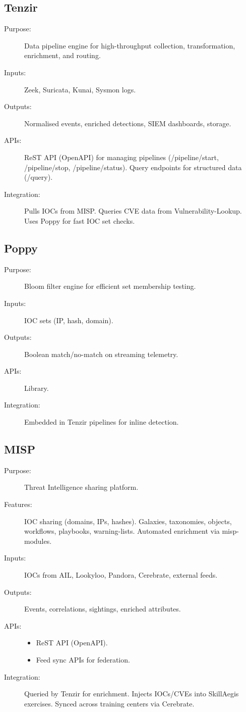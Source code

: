 \documentclass[10pt,a4paper]{report}
\begin{document}
\subsection{Tenzir}
\begin{description}
  \item[Purpose:] Data pipeline engine for high-throughput collection,
  transformation, enrichment, and routing.
  \item[Inputs:] Zeek, Suricata, Kunai, Sysmon logs.
  \item[Outputs:] Normalised events, enriched detections, SIEM dashboards,
  storage.
  \item[APIs:] ReST API (OpenAPI) for managing pipelines
  (/pipeline/start, /pipeline/stop, /pipeline/status). Query endpoints for
  structured data (/query).
  \item[Integration:] Pulls IOCs from MISP. Queries CVE data from
  Vulnerability-Lookup. Uses Poppy for fast IOC set checks.
\end{description}

\subsection{Poppy}
\begin{description}
  \item[Purpose:] Bloom filter engine for efficient set membership testing.
  \item[Inputs:] IOC sets (IP, hash, domain).
  \item[Outputs:] Boolean match/no-match on streaming telemetry.
  \item[APIs:] Library\cite{poppy}.
  \item[Integration:] Embedded in Tenzir pipelines for inline detection.
\end{description}

\subsection{MISP}
\begin{description}
  \item[Purpose:] Threat Intelligence sharing platform.
  \item[Features:] IOC sharing (domains, IPs, hashes). Galaxies, taxonomies,
  objects, workflows, playbooks, warning-lists. Automated enrichment via
  misp-modules.
  \item[Inputs:] IOCs from AIL, Lookyloo, Pandora, Cerebrate, external feeds.
  \item[Outputs:] Events, correlations, sightings, enriched attributes.
  \item[APIs:]
    \begin{itemize}
        \item ReST API (OpenAPI)\cite{mopenapi}.
        \item Feed sync APIs for federation.
    \end{itemize}
  \item[Integration:] Queried by Tenzir for enrichment. Injects IOCs/CVEs
  into SkillAegis exercises. Synced across training centers via Cerebrate.
\end{description}
\end{document}
